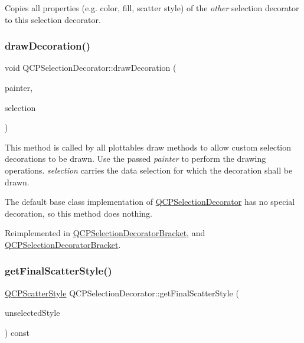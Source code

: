 Copies all properties (e.\+g. color, fill, scatter style) of the {\itshape other} selection decorator to this selection decorator. \mbox{\label{class_q_c_p_selection_decorator_a4f8eb49e277063845391e803ae23054a}} 
\subsubsection{\texorpdfstring{draw\+Decoration()}{drawDecoration()}}
{\footnotesize\ttfamily void Q\+C\+P\+Selection\+Decorator\+::draw\+Decoration (\begin{DoxyParamCaption}\item[{\hyperlink{class_q_c_p_painter}{Q\+C\+P\+Painter} $\ast$}]{painter,  }\item[{\hyperlink{class_q_c_p_data_selection}{Q\+C\+P\+Data\+Selection}}]{selection }\end{DoxyParamCaption})\hspace{0.3cm}{\ttfamily [virtual]}}

This method is called by all plottables\textquotesingle{} draw methods to allow custom selection decorations to be drawn. Use the passed {\itshape painter} to perform the drawing operations. {\itshape selection} carries the data selection for which the decoration shall be drawn.

The default base class implementation of \hyperlink{class_q_c_p_selection_decorator}{Q\+C\+P\+Selection\+Decorator} has no special decoration, so this method does nothing. 

Reimplemented in \hyperlink{class_q_c_p_selection_decorator_bracket_a1ceb893063ea3d7197a24098018f4bfb}{Q\+C\+P\+Selection\+Decorator\+Bracket}, and \hyperlink{class_q_c_p_selection_decorator_bracket_ae96f09ef95abf81a2514d54149387097}{Q\+C\+P\+Selection\+Decorator\+Bracket}.

\mbox{\label{class_q_c_p_selection_decorator_a1277b373248896bc70e8cc1de96da9fa}} 
\subsubsection{\texorpdfstring{get\+Final\+Scatter\+Style()}{getFinalScatterStyle()}}
{\footnotesize\ttfamily \hyperlink{class_q_c_p_scatter_style}{Q\+C\+P\+Scatter\+Style} Q\+C\+P\+Selection\+Decorator\+::get\+Final\+Scatter\+Style (\begin{DoxyParamCaption}\item[{const \hyperlink{class_q_c_p_scatter_style}{Q\+C\+P\+Scatter\+Style} \&}]{unselected\+Style }\end{DoxyParamCaption}) const}

